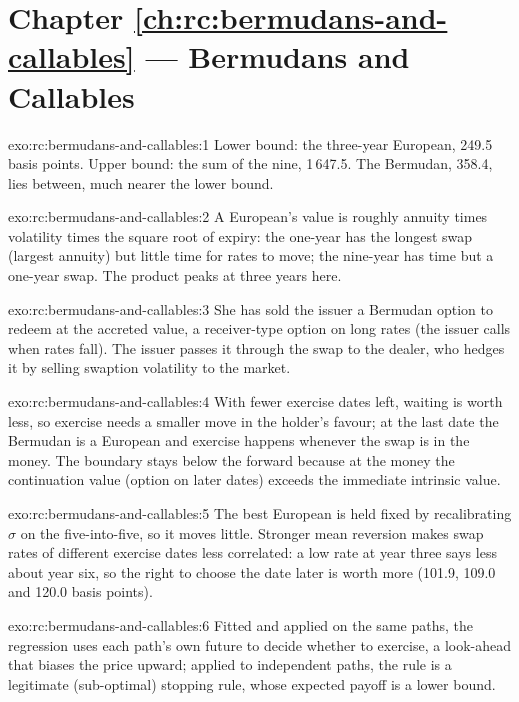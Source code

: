 \section*{Chapter \ref{ch:rc:bermudans-and-callables} --- Bermudans and Callables}

\begin{solution}{exo:rc:bermudans-and-callables:1}
Lower bound: the three-year European, 249.5 basis points. Upper bound: the sum of the
nine, 1\,647.5. The Bermudan, 358.4, lies between, much nearer the lower bound.
\end{solution}

\begin{solution}{exo:rc:bermudans-and-callables:2}
A European's value is roughly annuity times volatility times the square root of
expiry: the one-year has the longest swap (largest annuity) but little time for
rates to move; the nine-year has time but a one-year swap. The product peaks at
three years here.
\end{solution}

\begin{solution}{exo:rc:bermudans-and-callables:3}
She has sold the issuer a Bermudan option to redeem at the accreted value, a
receiver-type option on long rates (the issuer calls when rates fall). The issuer
passes it through the swap to the dealer, who hedges it by selling swaption
volatility to the market.
\end{solution}

\begin{solution}{exo:rc:bermudans-and-callables:4}
With fewer exercise dates left, waiting is worth less, so exercise needs a smaller
move in the holder's favour; at the last date the Bermudan is a European and
exercise happens whenever the swap is in the money. The boundary stays below the
forward because at the money the continuation value (option on later dates)
exceeds the immediate intrinsic value.
\end{solution}

\begin{solution}{exo:rc:bermudans-and-callables:5}
The best European is held fixed by recalibrating $\sigma$ on the five-into-five, so
it moves little. Stronger mean reversion makes swap rates of different exercise
dates less correlated: a low rate at year three says less about year six, so the
right to choose the date later is worth more (101.9, 109.0 and 120.0 basis points).
\end{solution}

\begin{solution}{exo:rc:bermudans-and-callables:6}
Fitted and applied on the same paths, the regression uses each path's own future
to decide whether to exercise, a look-ahead that biases the price upward; applied
to independent paths, the rule is a legitimate (sub-optimal) stopping rule, whose
expected payoff is a lower bound.
\end{solution}

